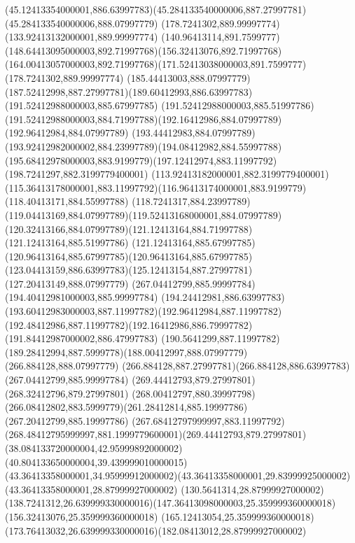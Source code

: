 {{	\curveto(45.12413354000001,886.63997783)(45.284133540000006,887.27997781)(45.284133540000006,888.07997779)
	\closepath
	\moveto(178.7241302,889.99997774)
	\lineto(133.92413132000001,889.99997774)
	\curveto(140.96413114,891.7599777)(148.64413095000003,892.71997768)(156.32413076,892.71997768)
	\curveto(164.00413057000003,892.71997768)(171.52413038000003,891.7599777)(178.7241302,889.99997774)
	\closepath
	\moveto(185.44413003,888.07997779)
	\curveto(187.52412998,887.27997781)(189.60412993,886.63997783)(191.52412988000003,885.67997785)
	\lineto(191.52412988000003,885.51997786)
	\curveto(191.52412988000003,884.71997788)(192.16412986,884.07997789)(192.96412984,884.07997789)
	\curveto(193.44412983,884.07997789)(193.92412982000002,884.23997789)(194.08412982,884.55997788)
	\curveto(195.68412978000003,883.9199779)(197.12412974,883.11997792)(198.7241297,882.3199779400001)
	\lineto(113.92413182000001,882.3199779400001)
	\curveto(115.36413178000001,883.11997792)(116.96413174000001,883.9199779)(118.40413171,884.55997788)
	\curveto(118.7241317,884.23997789)(119.04413169,884.07997789)(119.52413168000001,884.07997789)
	\curveto(120.32413166,884.07997789)(121.12413164,884.71997788)(121.12413164,885.51997786)
	\curveto(121.12413164,885.67997785)(120.96413164,885.67997785)(120.96413164,885.67997785)
	\curveto(123.04413159,886.63997783)(125.12413154,887.27997781)(127.20413149,888.07997779)
	\closepath
	\moveto(267.04412799,885.99997784)
	\lineto(194.40412981000003,885.99997784)
	\curveto(194.24412981,886.63997783)(193.60412983000003,887.11997782)(192.96412984,887.11997782)
	\curveto(192.48412986,887.11997782)(192.16412986,886.79997782)(191.84412987000002,886.47997783)
	\curveto(190.5641299,887.11997782)(189.28412994,887.5999778)(188.00412997,888.07997779)
	\lineto(266.884128,888.07997779)
	\curveto(266.884128,887.27997781)(266.884128,886.63997783)(267.04412799,885.99997784)
	\closepath
	\moveto(269.44412793,879.27997801)
	\lineto(268.32412796,879.27997801)
	\curveto(268.00412797,880.39997798)(266.08412802,883.5999779)(261.28412814,885.19997786)
	\lineto(267.20412799,885.19997786)
	\curveto(267.68412797999997,883.11997792)(268.48412795999997,881.1999779600001)(269.44412793,879.27997801)
	\closepath
	\moveto(38.084133720000004,42.95999892000002)
	\curveto(40.804133650000004,39.439999010000015)(43.36413358000001,34.95999912000002)(43.36413358000001,29.83999925000002)
	\lineto(43.36413358000001,28.87999927000002)
	\lineto(130.5641314,28.87999927000002)
	\curveto(138.7241312,26.639999330000016)(147.36413098000003,25.359999360000018)(156.32413076,25.359999360000018)
	\curveto(165.12413054,25.359999360000018)(173.76413032,26.639999330000016)(182.08413012,28.87999927000002)
}}
